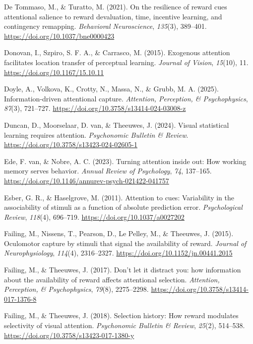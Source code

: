 \documentclass[
  man,
  floatsintext,
  longtable,
  nolmodern,
  notxfonts,
  notimes,
  mask,
  colorlinks=true,linkcolor=blue,citecolor=blue,urlcolor=blue]{apa7}
\newlength{\cslhangindent}
\newenvironment{CSLReferences}[2] %
 {\begin{list}{}{%
  \setlength{\itemindent}{0pt}
  \setlength{\leftmargin}{0pt}
  \setlength{\parsep}{0pt}
  \ifodd #1
   \setlength{\leftmargin}{\cslhangindent}
   \setlength{\itemindent}{-1\cslhangindent}
  \fi
  \setlength{\itemsep}{#2\baselineskip}}}
 {\end{list}}
\begin{document}
\begin{CSLReferences}{1}{0}
De Tommaso, M., \& Turatto, M. (2021). On the resilience of reward cues
attentional salience to reward devaluation, time, incentive learning,
and contingency remapping. \emph{Behavioral Neuroscience},
\emph{135}(3), 389--401. \url{https://doi.org/10.1037/bne0000423}

Donovan, I., Szpiro, S. F. A., \& Carrasco, M. (2015). Exogenous
attention facilitates location transfer of perceptual learning.
\emph{Journal of Vision}, \emph{15}(10), 11.
\url{https://doi.org/10.1167/15.10.11}

Doyle, A., Volkova, K., Crotty, N., Massa, N., \& Grubb, M. A. (2025).
Information-driven attentional capture. \emph{Attention, Perception, \&
Psychophysics}, \emph{87}(3), 721--727.
\url{https://doi.org/10.3758/s13414-024-03008-z}

Duncan, D., Moorselaar, D. van, \& Theeuwes, J. (2024). Visual
statistical learning requires attention. \emph{Psychonomic Bulletin \&
Review}. \url{https://doi.org/10.3758/s13423-024-02605-1}

Ede, F. van, \& Nobre, A. C. (2023). Turning attention inside out: How
working memory serves behavior. \emph{Annual Review of Psychology},
\emph{74}, 137--165.
\url{https://doi.org/10.1146/annurev-psych-021422-041757}

Esber, G. R., \& Haselgrove, M. (2011). Attention to cues: Variability
in the associability of stimuli as a function of absolute prediction
error. \emph{Psychological Review}, \emph{118}(4), 696--719.
\url{https://doi.org/10.1037/a0027202}

Failing, M., Nissens, T., Pearson, D., Le Pelley, M., \& Theeuwes, J.
(2015). Oculomotor capture by stimuli that signal the availability of
reward. \emph{Journal of Neurophysiology}, \emph{114}(4), 2316--2327.
\url{https://doi.org/10.1152/jn.00441.2015}

Failing, M., \& Theeuwes, J. (2017). Don{'}t let it distract you: how
information about the availability of reward affects attentional
selection. \emph{Attention, Perception, \& Psychophysics}, \emph{79}(8),
2275--2298. \url{https://doi.org/10.3758/s13414-017-1376-8}

Failing, M., \& Theeuwes, J. (2018). Selection history: How reward
modulates selectivity of visual attention. \emph{Psychonomic Bulletin \&
Review}, \emph{25}(2), 514--538.
\url{https://doi.org/10.3758/s13423-017-1380-y}


\end{CSLReferences}
\end{document}
